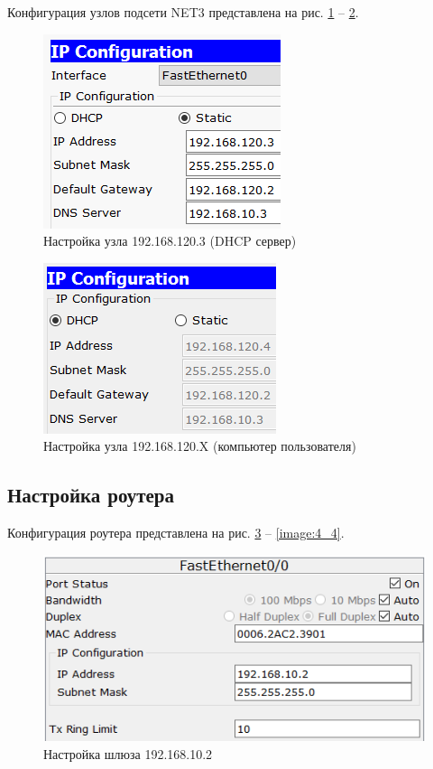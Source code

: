 Конфигурация узлов подсети NET3 представлена на рис. \ref{image:3_1} -- \ref{image:3_2}.

\begin{figure}[h!]
	\centering
	\includegraphics[scale = 0.65]{images/3_1.png}
	\caption{Настройка узла 192.168.120.3 (DHCP сервер)}
	\label{image:3_1}
\end{figure}

\begin{figure}[h!]
	\centering
	\includegraphics[scale = 0.65]{images/3_2.png}
	\caption{Настройка узла 192.168.120.X (компьютер пользователя)}
	\label{image:3_2}
\end{figure}

\subsection{Настройка роутера}

Конфигурация роутера представлена на рис. \ref{image:4_1} -- \ref{image:4_4}.

\begin{figure}[h!]
	\centering
	\includegraphics[scale = 0.65]{images/4_1.png}
	\caption{Настройка шлюза 192.168.10.2}
	\label{image:4_1}
\end{figure}

